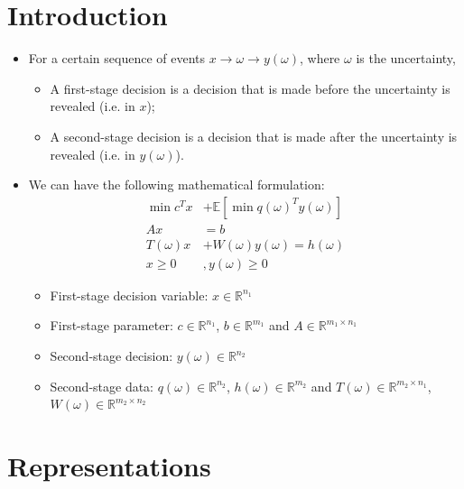 \documentclass[12pt, openany]{report}
\newcommand{\R}{\mathbb{R}}
\newcommand{\E}{\mathbb{E}}
\theoremstyle{definition}
\begin{document}
\section{Introduction}
\begin{itemize}
	\item  For a certain sequence of events $x \to \omega \to y(\omega)$, where $\omega$ is the uncertainty,
	\begin{itemize}
		\item A first-stage decision is a decision that is made before the uncertainty is revealed (i.e. in $x$);
		\item A second-stage decision is a decision that is made after the uncertainty is revealed (i.e. in $y(\omega)$).
	\end{itemize}
	\item We can have the following mathematical formulation:
	\begin{equation}\label{eq:TSSLP_formulation}
		\begin{aligned}
			\min c^T x &+ \E[\min q(\omega)^T y(\omega)]\\
			Ax &= b\\
			T(\omega) x &+ W(\omega)y(\omega) = h(\omega)\\
			x \geq 0&, y(\omega) \geq 0
		\end{aligned}
	\end{equation}
	\begin{itemize}
		\item First-stage decision variable: $x \in \R^{n_1}$
		\item First-stage parameter: $c \in \R^{n_1}$, $b \in \R^{m_1}$ and $A \in \R^{m_1 \times n_1}$
		\item Second-stage decision: $y(\omega) \in \R^{n_2}$
		\item Second-stage data: $q(\omega) \in \R^{n_2}$, $h(\omega) \in \R^{m_2}$ and $T(\omega) \in \R^{m_2 \times n_1}$, $W(\omega) \in \R^{m_2 \times n_2}$
	\end{itemize}
\end{itemize}
\section{Representations}
\end{document}
